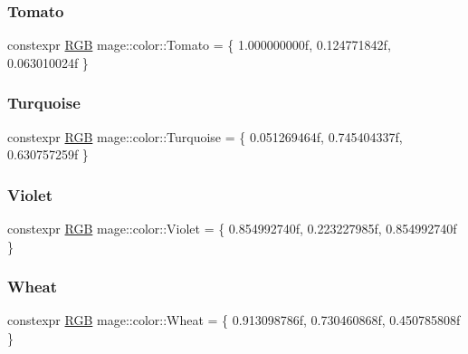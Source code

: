 \mbox{\label{namespacemage_1_1color_a9b06c8cba67af690ad468fc816c33932}} 
\subsubsection{\texorpdfstring{Tomato}{Tomato}}
{\footnotesize\ttfamily constexpr \mbox{\hyperlink{structmage_1_1_r_g_b}{R\+GB}} mage\+::color\+::\+Tomato = \{ 1.\+000000000f, 0.\+124771842f, 0.\+063010024f \}}

\mbox{\label{namespacemage_1_1color_aec5f952221972849e7c9033eb2dc8dcf}} 
\subsubsection{\texorpdfstring{Turquoise}{Turquoise}}
{\footnotesize\ttfamily constexpr \mbox{\hyperlink{structmage_1_1_r_g_b}{R\+GB}} mage\+::color\+::\+Turquoise = \{ 0.\+051269464f, 0.\+745404337f, 0.\+630757259f \}}

\mbox{\label{namespacemage_1_1color_a2e9d37cb1ef054fad5b999c98e4bb80c}} 
\subsubsection{\texorpdfstring{Violet}{Violet}}
{\footnotesize\ttfamily constexpr \mbox{\hyperlink{structmage_1_1_r_g_b}{R\+GB}} mage\+::color\+::\+Violet = \{ 0.\+854992740f, 0.\+223227985f, 0.\+854992740f \}}

\mbox{\label{namespacemage_1_1color_a7e58d877ef2ef3fdfe2520b1e8090cdf}} 
\subsubsection{\texorpdfstring{Wheat}{Wheat}}
{\footnotesize\ttfamily constexpr \mbox{\hyperlink{structmage_1_1_r_g_b}{R\+GB}} mage\+::color\+::\+Wheat = \{ 0.\+913098786f, 0.\+730460868f, 0.\+450785808f \}}

